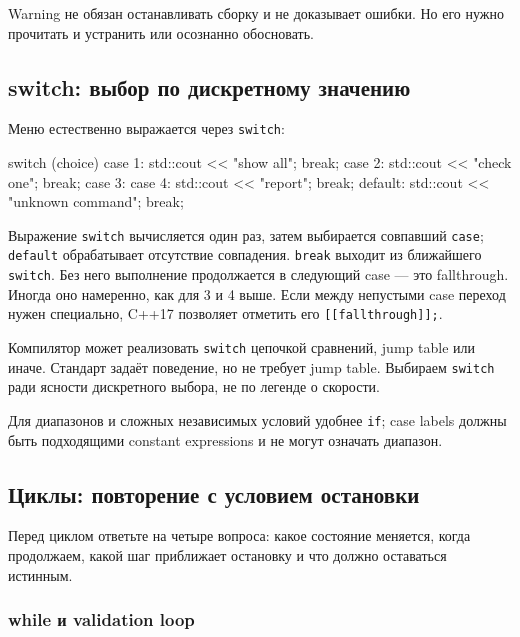 Warning не обязан останавливать сборку и не доказывает
ошибки. Но его нужно прочитать и устранить или осознанно обосновать.

\subsection{switch: выбор по дискретному значению}

Меню естественно выражается через \texttt{switch}:

\begin{cppcode}
switch (choice) {
case 1:
    std::cout << "show all\n";
    break;
case 2:
    std::cout << "check one\n";
    break;
case 3:
case 4:
    std::cout << "report\n";
    break;
default:
    std::cout << "unknown command\n";
    break;
}
\end{cppcode}

Выражение \texttt{switch} вычисляется один раз, затем выбирается совпавший
\texttt{case}; \texttt{default} обрабатывает отсутствие совпадения.
\texttt{break} выходит из ближайшего \texttt{switch}. Без него выполнение
продолжается в следующий case --- это fallthrough. Иногда оно намеренно, как
для 3 и 4 выше. Если между непустыми case переход нужен специально, C++17
позволяет отметить его \texttt{[[fallthrough]];}.

\begin{implementationbox}
Компилятор может реализовать \texttt{switch} цепочкой сравнений, jump table
или иначе. Стандарт задаёт поведение, но не требует jump table. Выбираем
\texttt{switch} ради ясности дискретного выбора, не по легенде о скорости.
\end{implementationbox}

Для диапазонов и сложных независимых условий удобнее \texttt{if}; case labels
должны быть подходящими constant expressions и не могут означать диапазон.

\subsection{Циклы: повторение с условием остановки}

Перед циклом ответьте на четыре вопроса: какое состояние меняется, когда
продолжаем, какой шаг приближает остановку и что должно оставаться истинным.

\subsubsection{while и validation loop}

